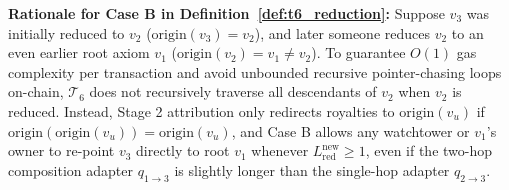 \documentclass[runningheads,a4paper]{llncs}
\renewcommand{\_}{\textunderscore\allowbreak}
\begin{document}
\textbf{Rationale for Case B in Definition~\ref{def:t6_reduction}:} Suppose $v_3$ was initially reduced to $v_2$ ($\text{origin}(v_3) = v_2$), and later someone reduces $v_2$ to an even earlier root axiom $v_1$ ($\text{origin}(v_2) = v_1 \neq v_2$). To guarantee $O(1)$ gas complexity per transaction and avoid unbounded recursive pointer-chasing loops on-chain, $\mathcal{T}_6$ does not recursively traverse all descendants of $v_2$ when $v_2$ is reduced. Instead, Stage 2 attribution only redirects royalties to $\text{origin}(v_u)$ if $\text{origin}(\text{origin}(v_u)) = \text{origin}(v_u)$, and Case B allows any watchtower or $v_1$'s owner to re-point $v_3$ directly to root $v_1$ whenever $L_{\text{red}}^{\text{new}} \ge 1$, even if the two-hop composition adapter $q_{1 \to 3}$ is slightly longer than the single-hop adapter $q_{2 \to 3}$.
\end{document}
